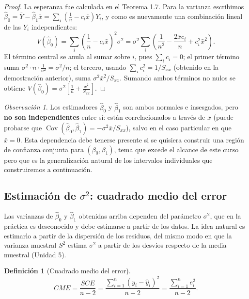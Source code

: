 \documentclass[11pt,a4paper]{article}
\theoremstyle{plain}
\theoremstyle{definition}
\newtheorem{definicion}[teorema]{Definición}
\theoremstyle{remark}
\newtheorem{observacion}[teorema]{Observación}
\begin{document}
\begin{proof}
La esperanza fue calculada en el Teorema 1.7. Para la varianza escribimos $\hat\beta_0=\bar Y-\hat\beta_1\bar x=\sum_i\left(\frac1n-c_i\bar x\right)Y_i$, y como es nuevamente una combinación lineal de las $Y_i$ independientes:
\[
V(\hat\beta_0) = \sum_i \left(\frac1n-c_i\bar x\right)^2 \sigma^2 = \sigma^2\sum_i\left(\frac{1}{n^2} - \frac{2\bar xc_i}{n} + c_i^2\bar x^2\right).
\]
El término central se anula al sumar sobre $i$, pues $\sum_ic_i=0$; el primer término suma $\sigma^2\cdot n\cdot\frac{1}{n^2}=\sigma^2/n$; el tercero, usando $\sum_ic_i^2=1/S_{xx}$ (obtenido en la demostración anterior), suma $\sigma^2\bar x^2/S_{xx}$. Sumando ambos términos no nulos se obtiene $V(\hat\beta_0)=\sigma^2\left[\frac1n+\frac{\bar x^2}{S_{xx}}\right]$.
\end{proof}

\begin{observacion}
Los estimadores $\hat\beta_0$ y $\hat\beta_1$ son ambos normales e insesgados, pero \textbf{no son independientes} entre sí: están correlacionados a través de $\bar x$ (puede probarse que $\operatorname{Cov}(\hat\beta_0,\hat\beta_1)=-\sigma^2\bar x/S_{xx}$), salvo en el caso particular en que $\bar x=0$. Esta dependencia debe tenerse presente si se quisiera construir una región de confianza conjunta para $(\beta_0,\beta_1)$, tema que excede el alcance de este curso pero que es la generalización natural de los intervalos individuales que construiremos a continuación.
\end{observacion}

\subsection{Estimación de \texorpdfstring{$\sigma^2$}{sigma\texttwosuperior}: cuadrado medio del error}

Las varianzas de $\hat\beta_0$ y $\hat\beta_1$ obtenidas arriba dependen del parámetro $\sigma^2$, que en la práctica es desconocido y debe estimarse a partir de los datos. La idea natural es estimarlo a partir de la dispersión de los residuos, del mismo modo en que la varianza muestral $S^2$ estima $\sigma^2$ a partir de los desvíos respecto de la media muestral (Unidad 5).

\begin{definicion}[Cuadrado medio del error]
\[
CME = \frac{SCE}{n-2} = \frac{\sum_{i=1}^n (y_i-\hat y_i)^2}{n-2} = \frac{\sum_{i=1}^n e_i^2}{n-2}.
\]
\end{definicion}
\end{document}
